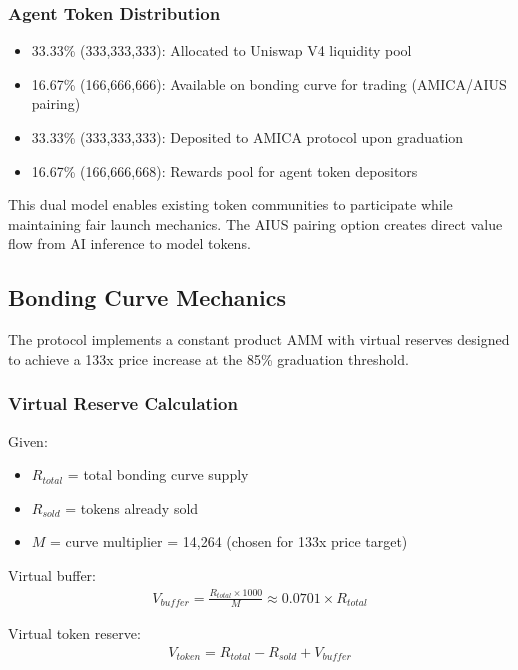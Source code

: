 \documentclass{article}
\begin{document}
\subsubsection{Agent Token Distribution}
\begin{itemize}
    \item 33.33\% (333,333,333): Allocated to Uniswap V4 liquidity pool
    \item 16.67\% (166,666,666): Available on bonding curve for trading (AMICA/AIUS pairing)
    \item 33.33\% (333,333,333): Deposited to AMICA protocol upon graduation
    \item 16.67\% (166,666,668): Rewards pool for agent token depositors
\end{itemize}

This dual model enables existing token communities to participate while maintaining fair launch mechanics. The AIUS pairing option creates direct value flow from AI inference to model tokens.

\subsection{Bonding Curve Mechanics}

The protocol implements a constant product AMM with virtual reserves designed to achieve a 133x price increase at the 85\% graduation threshold.

\subsubsection{Virtual Reserve Calculation}

Given:
\begin{itemize}
    \item $R_{total}$ = total bonding curve supply
    \item $R_{sold}$ = tokens already sold
    \item $M$ = curve multiplier = 14,264 (chosen for 133x price target)
\end{itemize}

Virtual buffer:
\begin{align}
V_{buffer} = \frac{R_{total} \times 1000}{M} \approx 0.0701 \times R_{total}
\end{align}

Virtual token reserve:
\begin{align}
V_{token} = R_{total} - R_{sold} + V_{buffer}
\end{align}
\end{document}
